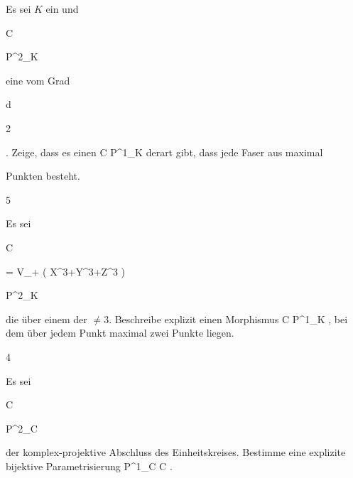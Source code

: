 {


Es sei $K$ ein
und


\mavergleichskette

{\vergleichskette

{C
}

{ \subset }{ {\mathbb P}^{2}_{K}
}

{  }{
}

{    }{
}

{   }{
}

}
{}{}{}
eine
vom Grad


\mavergleichskette

{\vergleichskette

{d
}

{ \geq }{ 2
}

{  }{
}

{    }{
}

{   }{
}

}
{}{}{.}
Zeige, dass es einen
\maabb {} { C } { {\mathbb P}^{1}_{K}
} {}
derart gibt, dass jede Faser aus maximal

 Punkten besteht.


}

{} {}



{5}

{


Es sei


\mavergleichskette

{\vergleichskette

{ C
}

{ = }{ V_+ \left(  X^3+Y^3+Z^3  \right)
}

{ \subseteq }{ {\mathbb P}^{2}_{K}
}

{    }{
}

{   }{
}

}
{}{}{}
die  {} über einem
der
$\neq 3$. Beschreibe explizit einen Morphismus
\maabb {} { C } { {\mathbb P}^{1}_{K}
} {,}
bei dem über jedem Punkt maximal zwei Punkte liegen.


}

{} {}



{4}

{


Es sei


\mavergleichskette

{\vergleichskette

{ C
}

{ \subseteq }{ {\mathbb P}^{2}_{ {\mathbb C}}
}

{  }{
}

{    }{
}

{   }{
}

}
{}{}{}
der komplex-projektive Abschluss des Einheitskreises. Bestimme eine explizite bijektive Parametrisierung
\maabb {} { {\mathbb P}^{1}_{ {\mathbb C}} } { C
} {.}


}

